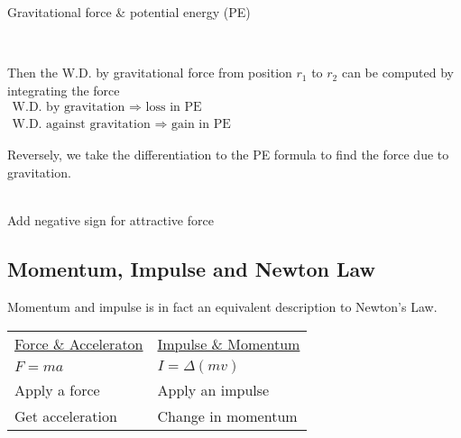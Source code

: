 \documentclass[class=article, crop=false, 12pt]{standalone}
\begin{document}
\begin{example} Gravitational force \& potential energy (PE)

    \\
    
    Then the W.D. by gravitational force from position $r_1$ to $r_2$ can be computed by integrating the force
    \\
    {$\substack{\displaystyle\text{W.D. by gravitation } \Rightarrow \text{ loss in PE} \\ \displaystyle\text{W.D. against gravitation }\Rightarrow \text{ gain in PE}}$}
    
    Reversely, we take the  differentiation to the PE formula to find the force due to gravitation.

    \\
    {Add negative sign for attractive force}

\end{example}

\subsection{Momentum, Impulse and Newton  Law}

Momentum and impulse is in fact an equivalent description to Newton's  Law.

\begin{center}
    \begin{tabular}{ >{\centering\arraybackslash}m{15em} | >{\centering\arraybackslash}m{15em} }
        \ul{Force \& Acceleraton} & \ul{Impulse \& Momentum} \\ 
        $F=ma$ & $I=\Delta(mv)$ \\  
        Apply a force & Apply an impulse \\
        Get acceleration & Change in momentum    
    \end{tabular}
\end{center}
\end{document}
